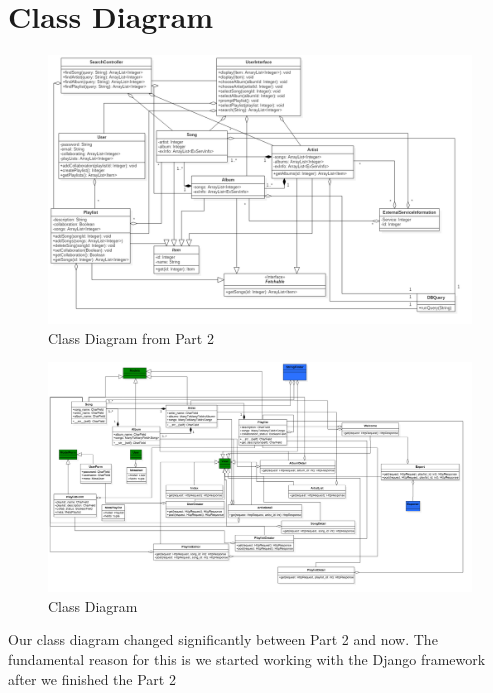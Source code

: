 \documentclass[12pt]{article}
\begin{document}
\section{Class Diagram}
\begin{figure}[H]
	\centering
	\includegraphics[scale=0.35]{MusicManagerClassDiagram.png}
	\caption{Class Diagram from Part 2}
	\label{fig:classDiagPart2}
\end{figure}
\begin{figure}[H]
	\centering
	\includegraphics[scale=0.25]{DiagramAddedSearch.png}
	\caption{Class Diagram}
	\label{fig:classDiagCompleted}
\end{figure}
Our class diagram changed significantly between Part 2 and now. The fundamental reason for this is we started working with the Django framework after we finished the Part 2 
\end{document}
